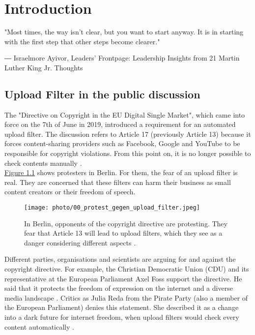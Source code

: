 \chapter{Introduction}
\label{ch:Introduction}
\epigraph{"Most times, the way isn’t clear, but you want to start anyway. It is in starting with the first step that other steps become clearer."}{― Israelmore Ayivor, Leaders' Frontpage: Leadership Insights from 21 Martin Luther King Jr. Thoughts}
\section{Upload Filter in the public discussion}
\label{sec:directiveCopyrightUploadFilters}

The "Directive on Copyright in the EU Digital Single Market", which came into force on the 7th of June in 2019,  introduced a requirement for an automated upload filter. The discussion refers to Article 17 (previously Article 13) because it forces content-sharing providers such as Facebook, Google and YouTube to be responsible for copyright violations. From this point on, it is no longer possible to check contents manually \cite{Emmawoollacott2019}.\\

\hyperref[fig:00_protest_gegen_upload_filter]{Figure \ref{fig:00_protest_gegen_upload_filter}} shows protesters in Berlin. For them, the fear of an upload filter is real. They are concerned that these filters can harm their business as small content creators or their freedom of speech.

\begin{figure}[!htp]
	\centering
	\texttt{[image: photo/00\_protest\_gegen\_upload\_filter.jpeg]}
	\caption{In Berlin, opponents of the copyright directive are protesting. They fear that Article 13 will lead to upload filters, which they see as a danger considering different aspects \cite{Protestg81:online}.}
	\label{fig:00_protest_gegen_upload_filter}
\end{figure}

Different parties, organisations and scientists are arguing for and against the copyright directive. For example, the Christian Democratic Union (CDU) and its representative at the European Parliament Axel Foss support the directive.  He said that it protects the freedom of expression on the internet and a diverse media landscape \cite{Europarl2017}. Critics as Julia Reda from the Pirate Party  (also a member of the European Parliament) denies this statement. She described it as a change into a dark future for internet freedom, when upload filters would check every content automatically \cite{Emmawoollacott2019}.\\

